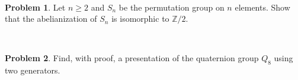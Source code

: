 \documentclass[11pt]{article}
\theoremstyle{definition}
\newtheorem{problem}{Problem}
\begin{document}
    \
    
    
    \begin{problem} Let $n\geq 2$ and $S_n$ be the permutation group on $n$ elements. Show that the abelianization of $S_n$ is isomorphic to $\mathbb{Z}/2$.
    \end{problem} 
    
    
    
    
    
    \
    
    
    \begin{problem}
    Find, with proof, a presentation of the quaternion group $Q_8$ using two generators.
    \end{problem}
\end{document}
